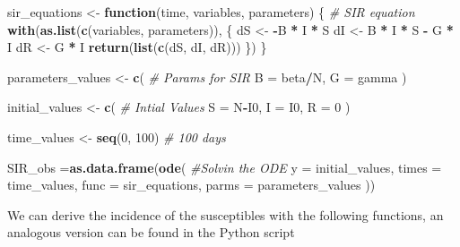 \documentclass[
]{article}
\newenvironment{Shaded}{\begin{snugshade}}{\end{snugshade}}
\newcommand{\AttributeTok}[1]{\textcolor[rgb]{0.13,0.29,0.53}{#1}}
\newcommand{\CommentTok}[1]{\textcolor[rgb]{0.56,0.35,0.01}{\textit{#1}}}
\newcommand{\ControlFlowTok}[1]{\textcolor[rgb]{0.13,0.29,0.53}{\textbf{#1}}}
\newcommand{\DecValTok}[1]{\textcolor[rgb]{0.00,0.00,0.81}{#1}}
\newcommand{\FunctionTok}[1]{\textcolor[rgb]{0.13,0.29,0.53}{\textbf{#1}}}
\newcommand{\NormalTok}[1]{#1}
\newcommand{\OtherTok}[1]{\textcolor[rgb]{0.56,0.35,0.01}{#1}}
\newcommand{\SpecialCharTok}[1]{\textcolor[rgb]{0.81,0.36,0.00}{\textbf{#1}}}
\begin{document}
\begin{Shaded}
\begin{Highlighting}[]
\NormalTok{sir\_equations }\OtherTok{\textless{}{-}} \ControlFlowTok{function}\NormalTok{(time, variables, parameters) \{ }\CommentTok{\# SIR equation}
  \FunctionTok{with}\NormalTok{(}\FunctionTok{as.list}\NormalTok{(}\FunctionTok{c}\NormalTok{(variables, parameters)), \{}
\NormalTok{    dS }\OtherTok{\textless{}{-}} \SpecialCharTok{{-}}\NormalTok{B }\SpecialCharTok{*}\NormalTok{ I }\SpecialCharTok{*}\NormalTok{ S}
\NormalTok{    dI }\OtherTok{\textless{}{-}}\NormalTok{  B }\SpecialCharTok{*}\NormalTok{ I }\SpecialCharTok{*}\NormalTok{ S }\SpecialCharTok{{-}}\NormalTok{ G }\SpecialCharTok{*}\NormalTok{ I}
\NormalTok{    dR }\OtherTok{\textless{}{-}}\NormalTok{  G }\SpecialCharTok{*}\NormalTok{ I}
    \FunctionTok{return}\NormalTok{(}\FunctionTok{list}\NormalTok{(}\FunctionTok{c}\NormalTok{(dS, dI, dR)))}
\NormalTok{  \})}
\NormalTok{\}}

\NormalTok{parameters\_values }\OtherTok{\textless{}{-}} \FunctionTok{c}\NormalTok{( }\CommentTok{\# Params for SIR}
  \AttributeTok{B  =}\NormalTok{ beta}\SpecialCharTok{/}\NormalTok{N, }
  \AttributeTok{G =}\NormalTok{ gamma}
\NormalTok{)}

\NormalTok{initial\_values }\OtherTok{\textless{}{-}} \FunctionTok{c}\NormalTok{( }\CommentTok{\# Intial Values}
  \AttributeTok{S =}\NormalTok{ N}\SpecialCharTok{{-}}\NormalTok{I0,  }
  \AttributeTok{I =}\NormalTok{   I0,}
  \AttributeTok{R =}   \DecValTok{0}  
\NormalTok{)}

\NormalTok{time\_values }\OtherTok{\textless{}{-}} \FunctionTok{seq}\NormalTok{(}\DecValTok{0}\NormalTok{, }\DecValTok{100}\NormalTok{) }\CommentTok{\# 100 days}

\NormalTok{SIR\_obs }\OtherTok{=}\FunctionTok{as.data.frame}\NormalTok{(}\FunctionTok{ode}\NormalTok{( }\CommentTok{\#Solvin the ODE}
  \AttributeTok{y =}\NormalTok{ initial\_values,}
  \AttributeTok{times =}\NormalTok{ time\_values,}
  \AttributeTok{func =}\NormalTok{ sir\_equations,}
  \AttributeTok{parms =}\NormalTok{ parameters\_values }
\NormalTok{))}
\end{Highlighting}
\end{Shaded}

We can derive the incidence of the susceptibles with the following
functions, an analogous version can be found in the Python script
\end{document}
